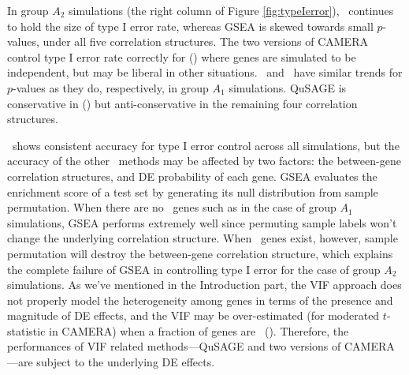 	In group $A_2$ simulations (the right column of Figure \ref{fig:typeIerror}),  
	\OurMethod~continues to hold the size of type I error rate, whereas GSEA is skewed towards 
	small $p$-values, under all five correlation structures. The two versions of CAMERA control 
	type I error rate correctly for	(\aaCase) where genes are simulated to be independent, but may 
	be liberal in other situations.
	\gent~and \genr~have similar trends for $p$-values as they do, respectively, in group $A_1$
	simulations. QuSAGE is conservative in (\cCase) but anti-conservative in the remaining four
	correlation structures.
	

	
	\OurMethod~shows consistent accuracy for type I error control across all simulations, but the
	accuracy of the other \HowmanyTest~methods may be affected by two factors: the between-gene
	correlation structures, and DE probability of each gene. %
	GSEA evaluates the enrichment score
	of a test set by generating its null distribution from sample permutation. When there are no 
	\DED~genes such as in the case of group $A_1$ simulations, GSEA performs extremely well since 
	permuting sample labels won't change the underlying correlation structure. When \DED~genes 
	exist, 
	however, sample	permutation will destroy the between-gene correlation structure, which 
	explains the complete failure of GSEA in controlling type I error for the case of group $A_2$ 
	simulations. As we've mentioned in the Introduction part, the VIF approach does not properly 
	model the heterogeneity among genes in terms of the presence and magnitude of DE effects, and 
	the VIF may be over-estimated (for moderated $t$-statistic in CAMERA)  when a fraction of genes 
	are \DED~(\thepapertobefinished). Therefore, the 
	performances of VIF related methods---QuSAGE and two versions of
	CAMERA---are subject to the underlying DE effects. 
	
